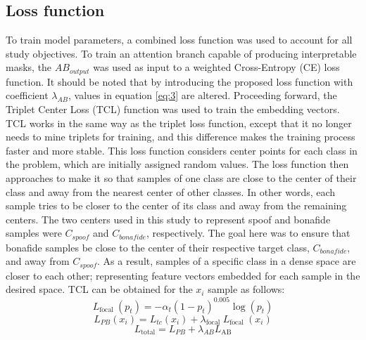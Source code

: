 \documentclass[a4paper]{article}
\begin{document}
\subsection{Loss function}
To train model parameters, a combined loss function was used to account for all study objectives. To train an attention branch capable of producing interpretable masks, the $AB_{output}$ was used as input to a weighted Cross-Entropy (CE) loss function. It should be noted that by introducing the proposed loss function with coefficient $\lambda_{AB}$, values in equation \ref{eq:3} are altered. Proceeding forward, the Triplet Center Loss (TCL) function was used to train the embedding vectors. TCL works in the same way as the triplet loss function, except that it no longer needs to mine triplets for training, and this difference makes the training process faster and more stable. This loss function considers center points for each class in the problem, which are initially assigned random values. The loss function then approaches to make it so that samples of one class are close to the center of their class and away from the nearest center of other classes. In other words, each sample tries to be closer to the center of its class and away from the remaining centers.  The two centers used in this study to represent spoof and bonafide samples were $C_{spoof}$ and $C_{bonafide}$, respectively. The goal here was to ensure that bonafide samples be close to the center of their respective target class, $C_{bonafide}$, and away from $C_{spoof}$. As a result, samples of a specific class in a dense space are closer to each other; representing feature vectors embedded for each sample in the desired space. TCL can be obtained for the $x_i$ sample as follows:
\begin{equation}
L_{\text {focal }}\left(p_{t}\right)=-\alpha_{t}\left(1-p_{t}\right)^{0.005} \log \left(p_{t}\right)
\end{equation}
\begin{equation}
L_{P B}\left(x_{i}\right)=L_{t c}\left(x_{i}\right)+\lambda_{\text {focal }} L_{\text {focal }}\left(x_{i}\right)
\end{equation}
\begin{equation}\label{eq:3}
L_{\text {total}}=L_{PB}+\lambda_{AB} L_{\mathrm{AB}}
\end{equation}
\end{document}
